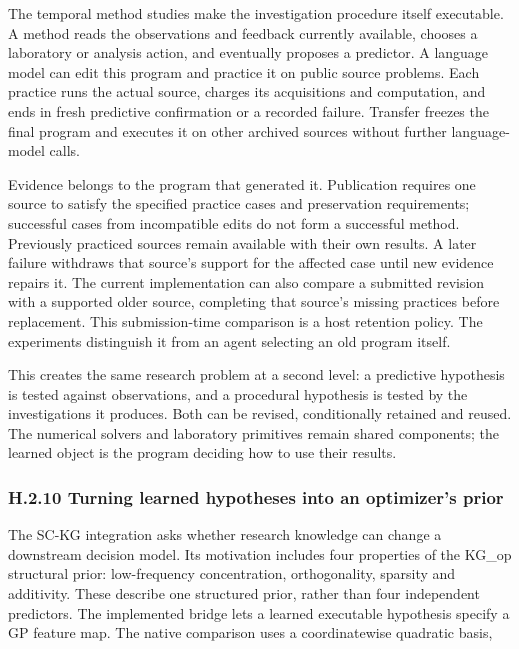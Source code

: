 \documentclass[11pt,a4paper]{article}
\begin{document}
The temporal method studies make the investigation procedure itself executable.
A method reads the observations and feedback currently available, chooses a
laboratory or analysis action, and eventually proposes a predictor. A language
model can edit this program and practice it on public source problems. Each
practice runs the actual source, charges its acquisitions and computation, and
ends in fresh predictive confirmation or a recorded failure. Transfer freezes
the final program and executes it on other archived sources without further
language-model calls.


Evidence belongs to the program that generated it. Publication requires one
source to satisfy the specified practice cases and preservation requirements;
successful cases from incompatible edits do not form a successful method.
Previously practiced sources remain available with their own results. A later
failure withdraws that source's support for the affected case until new evidence
repairs it. The current implementation can also compare a submitted revision
with a supported older source, completing that source's missing practices before
replacement. This submission-time comparison is a host retention policy. The
experiments distinguish it from an agent selecting an old program itself.


This creates the same research problem at a second level: a predictive hypothesis
is tested against observations, and a procedural hypothesis is tested by the
investigations it produces. Both can be revised, conditionally retained and
reused. The numerical solvers and laboratory primitives remain shared components;
the learned object is the program deciding how to use their results.


\subsubsection*{H.2.10 Turning learned hypotheses into an optimizer's prior}

The SC-KG integration asks whether research knowledge can change a downstream
decision model. Its motivation includes four properties of the KG\_op structural
prior: low-frequency concentration, orthogonality, sparsity and additivity.
These describe one structured prior, rather than four independent predictors.
The implemented bridge lets a learned executable hypothesis specify a GP feature
map. The native comparison uses a coordinatewise quadratic basis,
\end{document}
